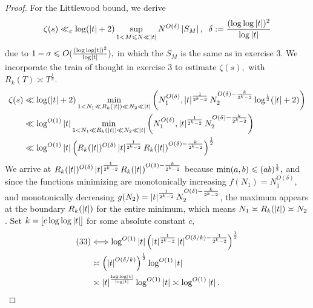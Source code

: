 \begin{proof}
For the Littlewood bound, we derive $$\zeta(s) \ll_\varepsilon \log(\left\lvert t \right\rvert+2) \sup_{1 < M \leqslant N \ll \left\lvert t \right\rvert} N^{O(\delta)} \left\lvert S_M \right\rvert, \;\; \delta := \frac{(\log\log \left\lvert t \right\rvert)^2}{\log \left\lvert t \right\rvert}$$ due to $1 - \sigma \leqslant O( \frac{(\log\log \left\lvert t \right\rvert)^2}{\log \left\lvert t \right\rvert} ),$ in which the $S_M$ is the same as in exercise 3. We incorporate the train of thought in exercise 3 to estimate $\zeta(s),$ with $R_k(T) \asymp T^\frac{1}{k}.$
\begin{align}
    \zeta(s) &\ll \log(\left\lvert t \right\rvert+2) \min_{1 < N_1 \ll R_k(\left\lvert t \right\rvert) \ll N_2 \ll \left\lvert t \right\rvert} \left( N_1^{O(\delta)}, \left\lvert t \right\rvert^\frac{1}{2^k-2} N_2^{O(\delta)-\frac{k}{2^k-2}} \log^\frac{1}{2}(\left\lvert t \right\rvert+2) \right) \\
    &\ll \log^{O(1)} \left\lvert t \right\rvert \min_{1 < N_1 \ll R_k(\left\lvert t \right\rvert) \ll N_2 \ll \left\lvert t \right\rvert} \left( N_1^{O(\delta)}, \left\lvert t \right\rvert^\frac{1}{2^k-2} N_2^{O(\delta)-\frac{k}{2^k-2}} \right) \\
    &\ll \log^{O(1)} \left\lvert t \right\rvert \left( R_k(\left\lvert t \right\rvert)^{O(\delta)} \left\lvert t \right\rvert^\frac{1}{2^k-2} R_k(\left\lvert t \right\rvert)^{O(\delta) - \frac{k}{2^{k}-2}} \right)^\frac{1}{2}
\end{align}
We arrive at $R_k(\left\lvert t \right\rvert)^{O(\delta)} \left\lvert t \right\rvert^\frac{1}{2^k-2} R_k(\left\lvert t \right\rvert)^{O(\delta) - \frac{k}{2^{k}-2}}$ because $\min(a,b) \leqslant (ab)^\frac{1}{2},$ and since the functions minimizing are monotonically increasing $f(N_1) = N_1^{O(\delta)}$, and monotonically decreasing $g(N_2) = \left\lvert t \right\rvert^\frac{1}{2^k-2} N_2^{O(\delta)-\frac{k}{2^k-2}}$, the maximum appears at the boundary $R_k(\left\lvert t \right\rvert)$ for the entire minimum, which means $N_1 \asymp R_k(\left\lvert t \right\rvert) \asymp N_2$. Set $k = [c \log \log \left\lvert t \right\rvert]$ for some absolute constant $c,$ 
\begin{align*}
    (33) &\Longleftrightarrow \log^{O(1)} \left\lvert t \right\rvert \left( \left\lvert t \right\rvert^\frac{1}{2^k-2} \left\lvert t \right\rvert^{O(\delta/k) - \frac{1}{2^{k}-2}} \right)^\frac{1}{2} \\ 
    &\asymp  \left( \left\lvert t \right\rvert^{O(\delta/k)} \right)^\frac{1}{2} \log^{O(1)} \left\lvert t \right\rvert \\ 
    &\asymp \left\lvert t \right\rvert^{\frac{\log \log \left\lvert t \right\rvert}{\log \left\lvert t \right\rvert}} \log^{O(1)} \left\lvert t \right\rvert \asymp \log^{O(1)} \left\lvert t \right\rvert.
\end{align*}


\end{proof}
